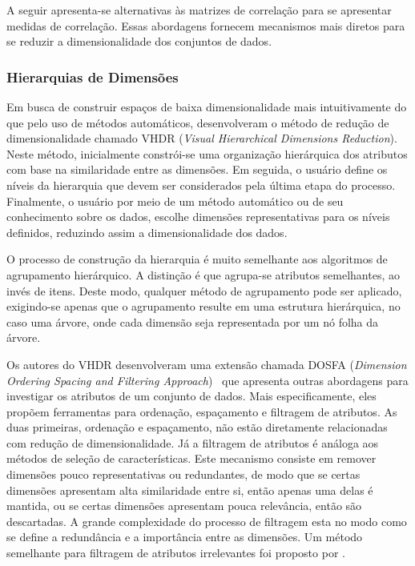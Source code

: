 A seguir apresenta-se alternativas às matrizes de correlação
para se apresentar medidas de correlação. Essas abordagens
fornecem mecanismos mais diretos para se reduzir a
dimensionalidade dos conjuntos de dados. 

\subsubsection{Hierarquias de Dimensões}

Em busca de construir espaços de baixa dimensionalidade mais
intuitivamente do que pelo uso de métodos automáticos,
\citet{Yang2003} desenvolveram o método de redução de
dimensionalidade chamado VHDR (\emph{Visual Hierarchical
Dimensions Reduction}). Neste método, inicialmente
constrói-se uma organização hierárquica dos atributos com
base na similaridade entre as dimensões. Em seguida, o
usuário define os níveis da hierarquia que devem ser
considerados pela última etapa do processo. Finalmente, o
usuário por meio de um método automático ou de seu
conhecimento sobre os dados, escolhe dimensões
representativas para os níveis definidos, reduzindo assim a
dimensionalidade dos dados. 

O processo de construção da hierarquia é muito semelhante
aos algoritmos de agrupamento hierárquico. A distinção é que
agrupa-se atributos semelhantes, ao invés de itens. Deste
modo, qualquer método de agrupamento pode ser aplicado,
exigindo-se apenas que o agrupamento resulte em uma
estrutura hierárquica, no caso uma árvore, onde cada
dimensão seja representada por um nó folha da árvore. 

Os autores do VHDR desenvolveram uma extensão chamada DOSFA
(\emph{Dimension Ordering Spacing and Filtering
Approach})~\cite{DOSFA} que apresenta outras abordagens para
investigar os atributos de um conjunto de dados. Mais
especificamente, eles propõem ferramentas para ordenação,
espaçamento e filtragem de atributos. As duas primeiras,
ordenação e espaçamento, não estão diretamente relacionadas
com redução de dimensionalidade. Já a filtragem de atributos
é análoga aos métodos de seleção de características. Este
mecanismo consiste em remover dimensões pouco
representativas ou redundantes, de modo que se certas
dimensões apresentam alta similaridade entre si, então
apenas uma delas é mantida, ou se certas dimensões
apresentam pouca relevância, então são descartadas. A grande
complexidade do processo de filtragem esta no modo como se
define a redundância e a importância entre as dimensões. Um
método semelhante para filtragem de atributos irrelevantes
foi proposto por \citet{Artero2006}.

